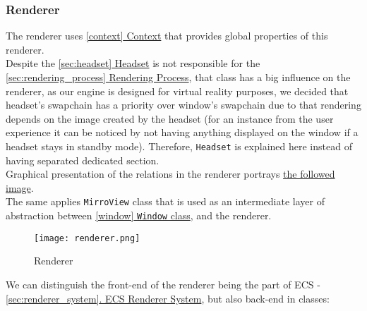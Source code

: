 \subsubsection{Renderer}
\label{sec:renderer}
\hspace{\parindent} The renderer uses \hyperref[context]{\ref*{context} Context} that provides global properties of this renderer.\\
Despite the \hyperref[sec:headset]{\ref*{sec:headset} Headset} is not responsible for the \hyperref[sec:rendering_process]{\ref*{sec:rendering_process} Rendering Process}, that class has a big influence on the renderer, as our engine is designed for virtual reality purposes, we decided that headset's swapchain has a priority over window's swapchain due to that rendering depends on the image created by the headset (for an instance from the user experience it can be noticed by not having anything displayed on the window if a headset stays in standby mode). Therefore, \texttt{Headset} is explained here instead of having separated dedicated section.\\ Graphical presentation of the relations in the renderer portrays \hyperref[fig:renderer]{the followed image}.\\
The same applies \texttt{MirroView} class that is used as an intermediate layer of abstraction between \hyperref[window]{\ref*{window} \texttt{Window} class}, and the renderer.
\label{fig:renderer}
\begin{figure}[H]
  \texttt{[image: renderer.png]}
  \caption{Renderer}
\end{figure}
We can distinguish the front-end of the renderer being the part of ECS - \hyperref[sec:renderer_system]{\ref*{sec:renderer_system}. ECS Renderer System}, but also back-end in classes:
